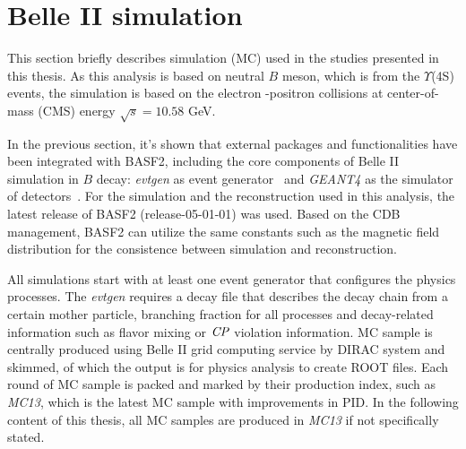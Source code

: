 \begin{comment}
\subsection{Summary}
BASF2 has been developed for an emphasis on providing reliable and high quality performance for Belle II analysis. It satisfies the most of demanding requirements of data taking, simulation, reconstruction, and offline analysis. 
\end{comment}

\section{Belle II simulation}

This section briefly describes simulation (MC) used in the studies presented in this thesis. As this analysis is based on neutral $B$ meson, which is from the $\Upsilon$(4S) events, the  simulation is based on the electron -positron collisions at center-of-mass (CMS) energy $\sqrt{s} = 10.58 $ GeV.

In the previous section, it's shown that external packages and functionalities have been integrated with BASF2, including the core components of Belle II simulation in $B$ decay: \textit{evtgen} as event generator~\cite{evtgen} and \textit{GEANT4} as the simulator of detectors~\cite{agostinelli2003geant4}. For the simulation and the reconstruction used in this analysis, the latest release of BASF2 (release-05-01-01) was used. Based on the CDB management, BASF2 can utilize the same constants such as the magnetic field distribution for the consistence between simulation and reconstruction.

 All simulations start with at least one event generator that configures the physics processes. The \textit{evtgen} requires a decay file that describes the decay chain from a certain mother particle, branching fraction for all processes and decay-related information such as flavor mixing or $\it{CP}$ violation information. MC sample is centrally produced using Belle II grid computing service by DIRAC system and skimmed, of which the output is for physics analysis to create ROOT files. Each round of MC sample is packed and marked by their production index, such as \textit{MC13}, which is the latest MC sample with improvements in PID. In the following content of this thesis, all MC samples are produced in \textit{MC13} if not specifically stated. 
 
